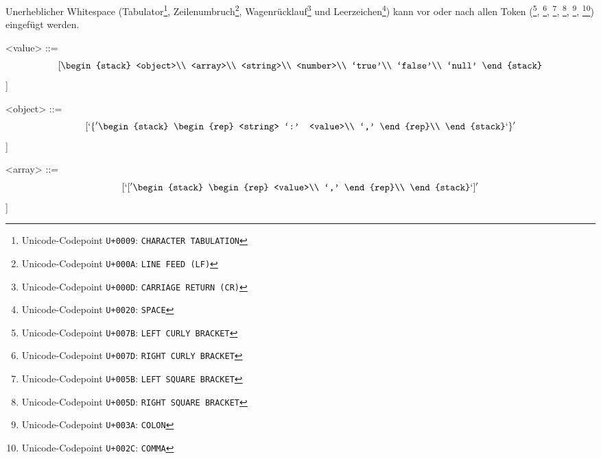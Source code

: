 \begin{definition}
\label{def:json}

Unerheblicher Whitespace (Tabulator\footnote{Unicode-Codepoint \texttt{U+0009}: \texttt{CHARACTER TABULATION}}, Zeilenumbruch\footnote{Unicode-Codepoint \texttt{U+000A}: \texttt{LINE FEED (LF)}}, Wagenrücklauf\footnote{Unicode-Codepoint \texttt{U+000D}: \texttt{CARRIAGE RETURN (CR)}} und Leerzeichen\footnote{Unicode-Codepoint \texttt{U+0020}: \texttt{SPACE}}) kann vor oder nach allen Token (\lit{\{}\footnote{Unicode-Codepoint \texttt{U+007B}: \texttt{LEFT CURLY BRACKET}}, \lit{\}}\footnote{Unicode-Codepoint \texttt{U+007D}: \texttt{RIGHT CURLY BRACKET}}, \lit{[}\footnote{Unicode-Codepoint \texttt{U+005B}: \texttt{LEFT SQUARE BRACKET}}, \lit{]}\footnote{Unicode-Codepoint \texttt{U+005D}: \texttt{RIGHT SQUARE BRACKET}}, \lit{:}\footnote{Unicode-Codepoint \texttt{U+003A}: \texttt{COLON}}, \lit{,}\footnote{Unicode-Codepoint \texttt{U+002C}: \texttt{COMMA}}) eingefügt werden.

\begin{grammar}
    <value> ::= \[[ \begin{stack}
                <object>\\
                <array>\\
                <string>\\
                <number>\\
                `true'\\
                `false'\\
                `null'
            \end{stack} \]]

    <object> ::= \[[ `\{' \begin{stack}
                \begin{rep}
                    <string> `:' <value>\\
                    `,'
                \end{rep}\\
        \end{stack} `\}' \]]

    <array> ::= \[[ `[' \begin{stack}
                \begin{rep}
                    <value>\\
                    `,'
                \end{rep}\\
        \end{stack} `]' \]]


\end{grammar}
\end{definition}
